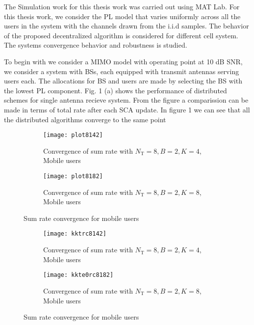 
The Simulation work for this thesis work was carried out using MAT Lab. For this thesis work, we consider the \ac{PL} model that varies uniformly across all the users in the system with the channels drawn from the i.i.d samples. The behavior of the proposed decentralized algorithm is considered for different cell system. The systems convergence behavior and robustness is studied. 

To begin with we consider a \ac{MIMO} model with operating point at 10 dB \ac{SNR}, we consider a system with  \ac{BS}s, each equipped with  transmit antennas serving  users each. The allocations for \ac{BS} and users are made by selecting the \ac{BS} with the lowest \ac{PL} component. Fig. 1 (a) shows the  performance of distributed schemes for single antenna recieve system. From the figure a comparission can be made in terms of total rate after each \ac{SCA} update. In figure 1 we can see that all the distributed algorithms converge to the same point

\begin{figure}
	\centering
	\begin{subfigure}[b]{0.75\textwidth}
		\centering
		\texttt{[image: plot8142]}
		\caption{Convergence of sum rate with $N_\mathrm{T} = 8, B = 2, K = 4$, Mobile users}
		\label{fig_1}
	\end{subfigure}
	\begin{subfigure}[b]{0.75\textwidth}
		\centering
		\texttt{[image: plot8182]}
		\caption{Convergence of sum rate with $N_\mathrm{T} = 8, B = 2, K = 8$, Mobile users}
		\label{fig-2}
	\end{subfigure}
	\caption{Sum rate convergence for mobile users}
	\label{figII}
\end{figure}


\begin{figure}
	\centering
	\begin{subfigure}[b]{0.75\textwidth}
		\centering
		\texttt{[image: kktrc8142]}
		\caption{Convergence of sum rate with $N_\mathrm{T} = 8, B = 2, K = 4$, Mobile users}
		\label{fig_1}
	\end{subfigure}
	\begin{subfigure}[b]{0.75\textwidth}
		\centering
		\texttt{[image: kkte0rc8182]}
		\caption{Convergence of sum rate with $N_\mathrm{T} = 8, B = 2, K = 8$, Mobile users}
		\label{fig-2}
	\end{subfigure}
	\caption{Sum rate convergence for mobile users}
	\label{figII}
\end{figure}

